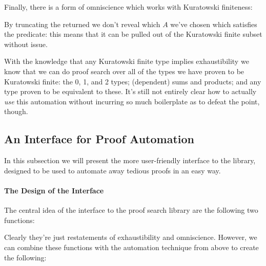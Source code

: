 Finally, there is a form of omniscience which works with Kuratowski finiteness:


By truncating the returned \AgdaDatatype{\ensuremath{\Sigma}} we don't reveal
which \(A\) we've chosen which satisfies the predicate: this means that it can
be pulled out of the Kuratowski finite subset without issue.



With the knowledge that any Kuratowski finite type implies exhaustibility we
know that we can do proof search over all of the types we have proven to be
Kuratowski finite: the 0, 1, and 2 types; (dependent) sums and products; and any
type proven to be equivalent to these.
It's still not entirely clear how to actually \emph{use} this automation without
incurring so much boilerplate as to defeat the point, though.
\subsection{An Interface for Proof Automation}
In this subsection we will present the more user-friendly interface to the library,
designed to be used to automate away tedious proofs in an easy way.
\paragraph{The Design of the Interface}
The central idea of the interface to the proof search library are the following
two functions:\\
\begin{minipage}{\linewidth}
  \begin{multicols}{2}
    
     \columnbreak
    
    
  \end{multicols}
\end{minipage}
Clearly they're just restatements of exhaustibility and omniscience.
However, we can combine these functions with the automation technique from above
to create the following:\\
\begin{minipage}{\linewidth}
  \begin{multicols}{2}
    
     \columnbreak
    
    
  \end{multicols}
\end{minipage}

